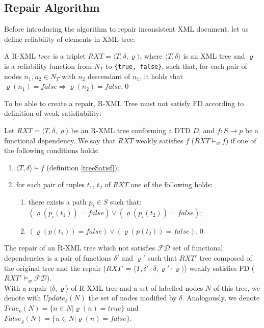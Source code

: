 \subsection{Repair Algorithm}

Before introducing the algorithm to repair inconsistent XML document, let us define reliability of elements in XML tree:

\begin{define}
A R-XML $tree$ is a triplet $RXT = \langle T, \delta, \varrho \rangle$, where $\langle T, \delta \rangle$ is an XML tree and $\varrho$ is a reliability function from $N_T$ to \texttt{\{true, false\}}, such that, for each pair of nodes $n_1 , n_2 \in N_T$ with $n_2$ descendant of $n_1$, it holds that $\varrho(n_1) = false \Rightarrow \varrho(n_2) = false$.\qed
\end{define}

To be able to create a repair, R-XML Tree must not satisfy FD according to definition of weak satisfiability:

\begin{define}
Let $RXT = \langle T, \delta, \varrho \rangle$ be an R-XML tree conforming a DTD $D$, and $f: S \rightarrow p$ be a functional dependency. We say that $RXT$ weakly satisfies $f$ ($RXT \models_w f$) if one of the following conditions holds:
\begin{enumerate}
	\item $\langle T, \delta \rangle \models f$ (definition \ref{treeSatisf});
    \item for each pair of tuples $t_1$, $t_2$ of $RXT$ one of the following holds:
    \begin{enumerate}
    	\item there exists a path $p_i \in S$ such that: \\
$(\varrho(p_i(t_1)) = false) \lor (\varrho(p_i(t_2)) = false)$;
        \item $(\varrho(p(t_1)) = false) \lor (\varrho(p(t_2)) = false)$.\qed
    \end{enumerate}
\end{enumerate}
\end{define}

The repair of an R-XML tree which not satisfies $\mathcal{FD}$ set of functional dependencies is a pair of functions $\delta'$ and $\varrho'$ such that $RXT'$ tree composed of the original tree and the repair ($RXT' = \langle T, \delta' \cdot \delta, \varrho' \cdot \varrho \rangle$) weakly satisfies FD ($RXT' \models_w \mathcal{FD}$).\\
With a repair $\langle \delta, \varrho \rangle$ of R-XML tree and a set of labelled nodes $N$ of this tree, we denote with $Update_{\delta}(N)$ the set of nodes modified by $\delta$. Analogously, we denote $True_{\varrho}(N) = \{n \in N| \varrho(n) = true\}$ and $False_{\varrho}(N) =\{n \in N | \varrho(n) = false\}$.

